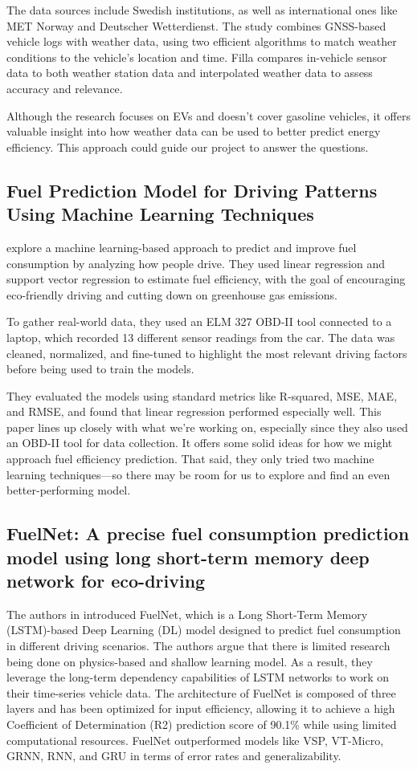 \documentclass[letterpaper]{article}
\begin{document}
The data sources include Swedish
institutions, as well as international ones like MET Norway and Deutscher
Wetterdienst. The study combines GNSS-based vehicle logs with weather data,
using two efficient algorithms to match weather conditions to the vehicle's
location and time. Filla compares in-vehicle sensor data to both weather station
data and interpolated weather data to assess accuracy and relevance. 

Although the research focuses on EVs and doesn't cover gasoline vehicles, it offers
valuable insight into how weather data can be used to better predict energy
efficiency. This approach could guide our project to answer the questions.

\subsection*{Fuel Prediction Model for Driving Patterns Using Machine Learning
Techniques}

\cite{Manjunath2024} explore a machine learning-based approach to predict and improve
fuel consumption by analyzing how people drive. They used linear regression and
support vector regression to estimate fuel efficiency, with the goal of
encouraging eco-friendly driving and cutting down on greenhouse gas emissions.

To gather real-world data, they used an ELM 327 OBD-II tool connected to a
laptop, which recorded 13 different sensor readings from the car. The data was
cleaned, normalized, and fine-tuned to highlight the most relevant driving
factors before being used to train the models. 

They evaluated the models using
standard metrics like R-squared, MSE, MAE, and RMSE, and found that linear
regression performed especially well. This paper lines up closely with what
we're working on, especially since they also used an OBD-II tool for data
collection. It offers some solid ideas for how we might approach fuel efficiency
prediction. That said, they only tried two machine learning techniques---so
there may be room for us to explore and find an even better-performing model.

\subsection*{FuelNet: A precise fuel consumption prediction model using long
short-term memory deep network for eco-driving}

The authors in \cite{wang2020fuelnet} introduced FuelNet, which is a Long
Short-Term Memory (LSTM)-based Deep Learning (DL) model designed to predict fuel
consumption in different driving scenarios. The authors argue that there is
limited research being done on physics-based and shallow learning model. As a
result, they leverage the long-term dependency capabilities of LSTM networks to
work on their time-series vehicle data. The architecture of FuelNet is composed
of three layers and has been optimized for input efficiency, allowing it to
achieve a high Coefficient of Determination (R2) prediction score of 90.1\% while
using limited computational resources. FuelNet outperformed models like VSP,
VT-Micro, GRNN, RNN, and GRU in terms of error rates and generalizability. 
\end{document}
